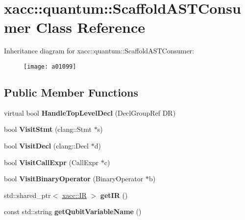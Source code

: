 \hypertarget{a01099}{}\section{xacc\+:\+:quantum\+:\+:Scaffold\+A\+S\+T\+Consumer Class Reference}
\label{a01099}
Inheritance diagram for xacc\+:\+:quantum\+:\+:Scaffold\+A\+S\+T\+Consumer\+:\begin{figure}[H]
\begin{center}
\leavevmode
\texttt{[image: a01099]}
\end{center}
\end{figure}
\subsection*{Public Member Functions}
\begin{DoxyCompactItemize}
\item 
\mbox{\label{a01099_ae846fd40684f3a1f820b8711e1204089}} 
virtual bool {\bfseries Handle\+Top\+Level\+Decl} (Decl\+Group\+Ref DR)
\item 
\mbox{\label{a01099_a6693c27f68332d8142fbdcb405e3259b}} 
bool {\bfseries Visit\+Stmt} (clang\+::\+Stmt $\ast$s)
\item 
\mbox{\label{a01099_ae6a05fe567cd8ea15feb694dbb898c33}} 
bool {\bfseries Visit\+Decl} (clang\+::\+Decl $\ast$d)
\item 
\mbox{\label{a01099_a1478fc9e887b04d2ad2aa8347ef6bbcb}} 
bool {\bfseries Visit\+Call\+Expr} (Call\+Expr $\ast$c)
\item 
\mbox{\label{a01099_a3f2f070888678caf53e57041b4f5ddd6}} 
bool {\bfseries Visit\+Binary\+Operator} (Binary\+Operator $\ast$b)
\item 
\mbox{\label{a01099_af9dbfa7c52b8a7de99132257e154e29a}} 
std\+::shared\+\_\+ptr$<$ \hyperlink{a01499}{xacc\+::\+IR} $>$ {\bfseries get\+IR} ()
\item 
\mbox{\label{a01099_aa301f0bcae6fb5a1c17557ba08144cb4}} 
const std\+::string {\bfseries get\+Qubit\+Variable\+Name} ()
\end{DoxyCompactItemize}
